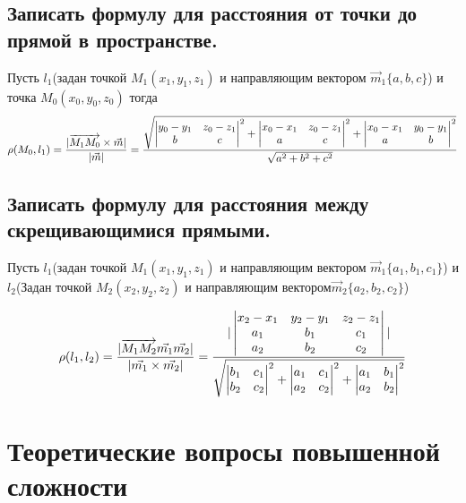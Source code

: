 \subsection{Записать формулу для расстояния от точки до прямой в пространстве.}

Пусть $l_1$(задан точкой $M_1(x_1, y_1, z_1)$ и направляющим вектором $\vec{m}_1\{a,b,c\}$) и точка 
$M_0(x_0,y_0,z_0)$ тогда 
$$\rho(M_0, l_1) = \frac{ |\overrightarrow{M_1M_0}\times\vec{m}| }{ |\vec{m}| } = 
\frac{\sqrt{\begin{vmatrix}y_0-y_1&z_0-z_1\\b&c\end{vmatrix}^2+
\begin{vmatrix}x_0-x_1&z_0-z_1\\a&c\end{vmatrix}^2+
\begin{vmatrix}x_0-x_1&y_0-y_1\\a&b\end{vmatrix}^2}}{\sqrt{a^2+b^2+c^2}}$$

\subsection{Записать формулу для расстояния между скрещивающимися прямыми.}

Пусть $l_1$(задан точкой $M_1(x_1, y_1, z_1)$ и направляющим вектором $\vec{m}_1\{a_1,b_1,c_1\}$) и 
$l_2$(Задан точкой $M_2(x_2, y_2, z_2)$ и направляющим вектором$\vec{m}_2\{a_2,b_2,c_2\}$)

$$\rho(l_1, l_2) = \frac{ |\overrightarrow{M_1M_2}\vec{m_1}\vec{m_2}| }{ |\vec{m_1}\times\vec{m_2}| }=
\frac{ |\begin{vmatrix}x_2-x_1&y_2-y_1&z_2-z_1\\a_1&b_1&c_1\\a_2&b_2&c_2\end{vmatrix}| }
    {\sqrt{\begin{vmatrix}b_1&c_1\\b_2&c_2\end{vmatrix}^2+
    \begin{vmatrix}a_1&c_1\\a_2&c_2\end{vmatrix}^2+
    \begin{vmatrix}a_1&b_1\\a_2&b_2\end{vmatrix}^2}}$$

\section{Теоретические вопросы повышенной сложности}

